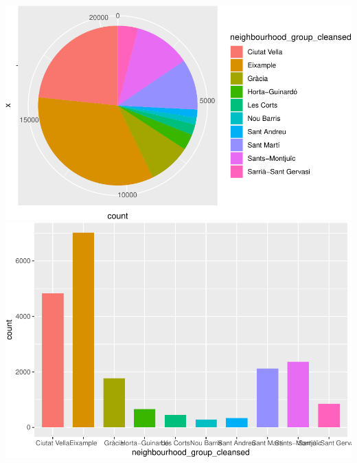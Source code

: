 \includegraphics{anal_files/figure-latex/unnamed-chunk-9-12.pdf}
\includegraphics{anal_files/figure-latex/unnamed-chunk-9-13.pdf}

